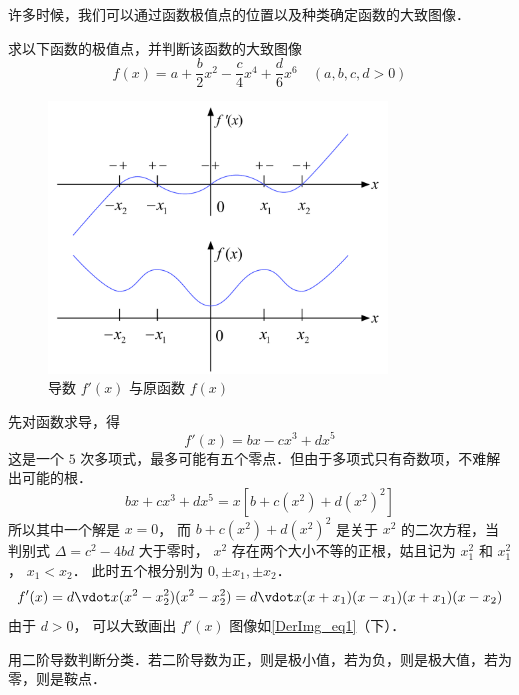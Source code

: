 

许多时候，我们可以通过函数极值点的位置以及种类确定函数的大致图像．

\begin{exam}{}
求以下函数的极值点，并判断该函数的大致图像
\begin{equation}
f(x) = a + \frac{b}{2}{x^2} - \frac{c}{4}{x^4} + \frac{d}{6}{x^6} \quad (a,b,c,d >0)
\end{equation}

\begin{figure}[ht]
\centering
\includegraphics[width=9cm]{./figures/DerImg.pdf}
\caption{导数 $f'(x)$ 与原函数 $f(x)$}\label{DerImg_eq1}
\end{figure}

先对函数求导，得
\begin{equation}
f'(x) = bx - c{x^3} + d{x^5} 
\end{equation}
这是一个 $5$ 次多项式，最多可能有五个零点．但由于多项式只有奇数项，不难解出可能的根．
 \begin{equation}
bx + c{x^3} + d{x^5} = x[{b + c({x^2}) + d{{({x^2})}^2}} ]
\end{equation}
所以其中一个解是 $x = 0$， 而 $b + c({x^2}) + d{({x^2})^2}$ 是关于 ${x^2}$ 的二次方程，当判别式 $\Delta  = {c^2} - 4bd$ 大于零时， ${x^2}$ 存在两个大小不等的正根，姑且记为 $x_1^2$ 和 $x_1^2$， ${x_1} < {x_2}$． 
此时五个根分别为 $0, \pm {x_1},\pm {x_2}$． 
\begin{equation}
f'(x) = d \vdot x (x^2 - x_2^2) (x^2 - x_2^2) = d \vdot x (x + x_1)(x - x_1)(x + x_1)(x - x_2)
\end{equation} 
由于 $d > 0$， 可以大致画出 $f'(x)$ 图像如\autoref{DerImg_eq1}（下）．

用二阶导数判断分类．若二阶导数为正，则是极小值，若为负，则是极大值，若为零，则是鞍点．
\end{exam}